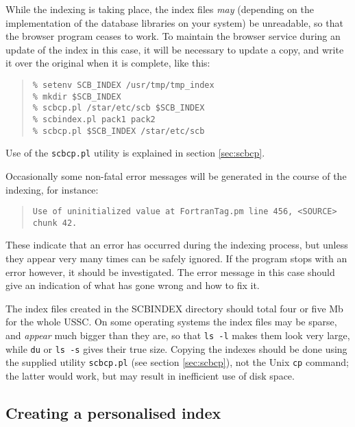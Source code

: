 \documentclass[twoside,11pt]{article}
\newcommand{\xlabel}[1]{}
\renewcommand{\_}{\texttt{\symbol{95}}}
\begin{document}
While the indexing is taking place, the index files {\it may} 
(depending on the implementation of the database libraries on
your system)
be unreadable, so that the browser program ceases to work.
To maintain the browser service during an update of the index in this
case, it will be necessary to update a copy, and write it over the
original when it is complete, like this:
\begin{quote}
\begin{verbatim}
% setenv SCB_INDEX /usr/tmp/tmp_index
% mkdir $SCB_INDEX
% scbcp.pl /star/etc/scb $SCB_INDEX
% scbindex.pl pack1 pack2
% scbcp.pl $SCB_INDEX /star/etc/scb
\end{verbatim}
\end{quote}
Use of the {\tt scbcp.pl} utility is explained in 
section \ref{sec:scbcp}.

Occasionally some non-fatal error messages will be generated in the 
course of the indexing, for instance:
\begin{quote}
\begin{verbatim}
Use of uninitialized value at FortranTag.pm line 456, <SOURCE> chunk 42.
\end{verbatim}
\end{quote}
These indicate that an error has occurred during the indexing process,
but unless they appear very many times can be safely ignored.
If the program stops with an error however, it should be investigated.
The error message in this case should give an indication of what has
gone wrong and how to fix it.

The index files created in the SCB\_INDEX directory should 
total four or five Mb for the whole USSC.  
On some operating systems the index files may be 
sparse, and {\em appear} much bigger than they are,
so that {\tt ls~-l} makes them look very large, 
while {\tt du} or {\tt ls~-s} gives their true size.
Copying the indexes should be done using the supplied utility
{\tt scbcp.pl} (see section \ref{sec:scbcp}), 
not the Unix {\tt cp} command; the latter would
work, but may result in inefficient use of disk space.


\subsection{\xlabel{sec:personalise}\label{sec:personalise}Creating a personalised index}
\end{document}
